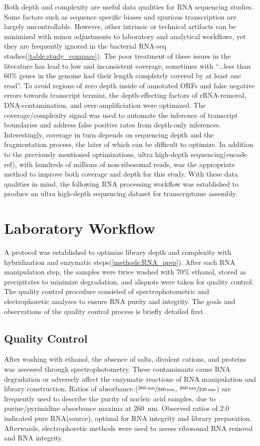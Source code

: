 Both depth and complexity are useful data qualities for RNA sequencing studies. Some factors such as sequence specific biases and spurious transcription are largely uncontrollable. However, other intrinsic or technical artifacts can be minimized with minor adjustments to laboratory and analytical workflows, yet they are frequently ignored in the bacterial RNA-seq studies(\ref{table:study_compare}). The poor treatment of these issues in the literature has lead to low and inconsistent coverage, sometimes with ``...less than 60\% genes in the genome had their length completely covered by at least one read''.\cite{115} To avoid regions of zero depth inside of annotated ORFs\cite{115} and false negative errors towards transcript termini, the depth-effecting factors of rRNA-removal, DNA-contamination, and over-amplificiation were optimized. The coverage/complexity signal was used to automate the inference of transcript boundaries and address false positive rates from depth-only inferences. Interestingly, coverage in turn depends on sequencing depth and the fragmentation process, the later of which can be difficult to optimize. In addition to the previously mentioned optimizations, ultra high-depth sequencing(encode ref), with hundreds of millions of non-ribosomal reads, was the appropriate method to improve both coverage and depth for this study. With these data qualities in mind, the following RNA processing workflow was established to produce an ultra high-depth sequencing dataset for transcriptome assembly.



\section{Laboratory Workflow}
A protocol was established to optimize library depth and complexity with hybridization and enzymatic steps(\ref{methods:RNA_prep}). After each RNA manipulation step, the samples were twice washed with 70\% ethanol, stored as precipitates to minimize degradation, and aliquots were taken for quality control. The quality control procedure consisted of spectrophotometric and electrophoretic analyses to ensure RNA purity and integrity. The goals and observations of the quality control process is briefly detailed first.

\subsection{Quality Control}
After washing with ethanol, the absence of salts, divalent cations, and proteins was assessed through spectrophotometry. These contaminants cause RNA degradation or adversely affect the enzymatic reactions of RNA manipulation and library construction. Ratios of absorbance ($\sfrac{\SI{260}{\nano\meter}}{\SI{280}{\nano\meter}}$, $\sfrac{\SI{260}{\nano\meter}}{\SI{230}{\nano\meter}}$) are frequently used to describe the purity of nucleic acid samples, due to purine/pyrimidine absorbance maxima at \SI{260}{\nano\meter}. Observed ratios of 2.0 indicated pure RNA(source), optimal for RNA integrity and library preparation. Afterwards, electrophoretic methods were used to assess ribosomal RNA removal and RNA integrity.

